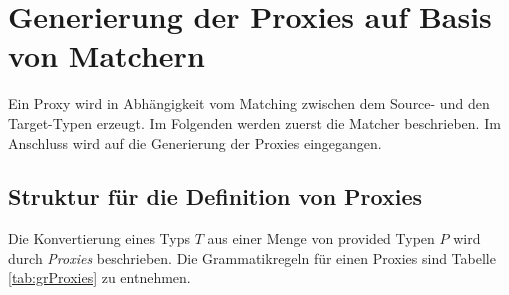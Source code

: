 \section{Generierung der Proxies auf Basis von Matchern}\label{sec_proxygen}
Ein Proxy wird in Abhängigkeit vom Matching zwischen dem Source- und den Target-Typen erzeugt. Im Folgenden werden zuerst die Matcher beschrieben. Im Anschluss wird auf die Generierung der Proxies eingegangen.
\subsection{Struktur für die Definition von Proxies}\label{sec:proxygram}
Die Konvertierung eines Typs $T$ aus einer Menge von provided Typen $P$ wird durch \emph{Proxies} beschrieben. Die Grammatikregeln für einen Proxies sind Tabelle \ref{tab:grProxies} zu entnehmen.
